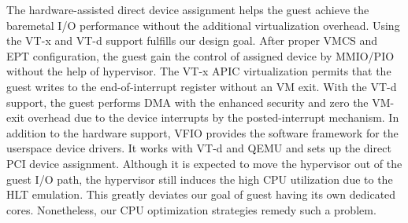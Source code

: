 The hardware-assisted direct device assignment helps the guest
achieve the baremetal I/O performance without the additional
virtualization overhead. Using the VT-x and VT-d support
fulfills our design goal. After proper VMCS and EPT
configuration, the guest gain the control of assigned device
by MMIO/PIO without the help of hypervisor. The VT-x APIC
virtualization permits that the guest writes to the
end-of-interrupt register without an VM exit. With the VT-d
support, the guest performs DMA with the enhanced security and
zero the VM-exit overhead due to the device interrupts by the
posted-interrupt mechanism. In addition to the hardware
support, VFIO provides the software framework for the
userspace device drivers. It works with VT-d and QEMU and sets
up the direct PCI device assignment. Although it is expected
to move the hypervisor out of the guest I/O path, the
hypervisor still induces the high CPU utilization due to the
HLT emulation. This greatly deviates our goal of guest having
its own dedicated cores. Nonetheless, our CPU optimization
strategies remedy such a problem.
